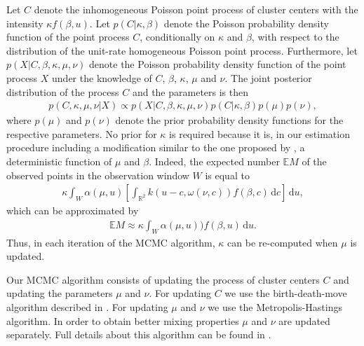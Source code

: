 Let $C$ denote the inhomogeneous Poisson point process of cluster centers with the intensity $\kappa f(\beta, u)$. 
Let $p(C|\kappa, \beta)$ denote the Poisson probability
density function of the point process $C$, conditionally on $\kappa$ and $\beta$,
with respect to the distribution of the unit-rate homogeneous Poisson point process. Furthermore, let  $p(X|C, \beta, \kappa, \mu, \nu)$ denote the Poisson probability
density function of the point process $X$ under the knowledge of $C$, $\beta$, $\kappa$, $\mu$ and $\nu$. The joint posterior distribution of the process $C$ and the parameters is then
\begin{align}
  p(C, \kappa, \mu, \nu |X) \propto p(X|C, \beta, \kappa, \mu, \nu) p(C|\kappa, \beta)  p(\mu) p(\nu),
\end{align} 
where $p(\mu)$ and $p(\nu)$ denote the prior probability density functions for the respective parameters. No prior for $\kappa$ is required because  it is, in our estimation procedure including a modification similar to the one proposed by \citet{KM2016}, a deterministic function of $\mu$ and $\beta$. Indeed, the expected number $\mathbb E M$ of the observed points in the observation window $W$ is equal to  
\begin{align*}
  \kappa  \int_W \alpha(\mu, u) \left[\int_{\mathbb R^2} k(u-c,\omega (\nu, c))f(\beta, c) \, \mathrm{d}c \right] \, \mathrm{d}u,
\end{align*}
which can be approximated by 
\begin{align*}
    \mathbb E M \approx \kappa  \int_W \alpha(\mu, u))f(\beta, u) \, \mathrm{d}u.
\end{align*}
Thus, in each iteration of the MCMC algorithm, $\kappa$ can be re-computed when $\mu$ is updated. 

Our MCMC algorithm consists of updating the process of cluster centers $C$ and updating the parameters $\mu$ and $\nu$. For updating $C$ we use the birth-death-move algorithm described in \citet{MollerWaagepetersen2004}. For updating $\mu$ and $\nu$ we use the Metropolis-Hastings algorithm. In order to obtain better mixing properties $\mu$ and $\nu$ are updated separately. Full details about this algorithm can be found in \cite{MS2017}.


